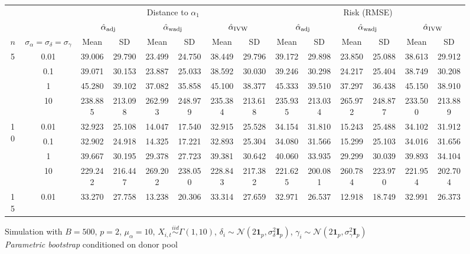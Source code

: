 \documentclass[11pt]{article}
\newcommand{\simiid}{\stackrel{iid}{\sim}} %
\def\normal#1#2{\mathcal{N}(#1,#2)} %
\theoremstyle{definition}
\begin{document}
\begin{sidewaysfigure}
\centering
\caption{Simulation  with $B = 500$, $p = 2$, $\mu_{\alpha}=10$, $X_{i,t} \simiid \Gamma(1,10)$, $\delta_i \sim \normal{2\mathbf{1}_p}{\sigma^2_{\delta}\mathbf{I}_p}$, $\gamma_i \sim \normal{2\mathbf{1}_p}{\sigma^2_{\gamma}\mathbf{I}_p}$ \\ \emph{Parametric bootstrap} conditioned on donor pool}
\begin{tabular}{cc|cccccc|cccccc}
  && \multicolumn{6}{c|}{Distance to $\alpha_1$}  & \multicolumn{6}{c}{Risk (RMSE)}  \\ 
   & & \multicolumn{2}{c}{$\hat{\alpha}_{\rm adj}$}  & \multicolumn{2}{c}{$\hat{\alpha}_{\rm wadj}$} & \multicolumn{2}{c|}{$\hat{\alpha}_{\rm IVW}$} & \multicolumn{2}{c}{$\hat{\alpha}_{\rm adj}$} & \multicolumn{2}{c}{$\hat{\alpha}_{\rm wadj}$}  & \multicolumn{2}{c}{$\hat{\alpha}_{\rm IVW}$}   \\ 
  $n$   & $\sigma_{\alpha} = \sigma_{\delta}=\sigma_{\gamma}$  & Mean & SD & Mean & SD & Mean & SD & Mean & SD & Mean & SD & Mean & SD  \\[.3cm]  
    \hline
 \multirow{4}{*}{5}  & 0.01 & 39.006 & 29.790 & 23.499 & 24.750 & 38.449 & 29.796 & 39.172 & 29.898 & 23.850 & 25.088 & 38.613 & 29.912 \\ 
    & 0.1 & 39.071 & 30.153 & 23.887 & 25.033 & 38.592 & 30.030 & 39.246 & 30.298 & 24.217 & 25.404 & 38.749 & 30.208 \\ 
   & 1   & 45.280 & 39.102 & 37.082 & 35.858 & 45.100 & 38.377 & 45.333 & 39.510 & 37.297 & 36.438 & 45.150 & 38.910 \\ 
   & 10   & 238.885 & 213.098 & 262.993 & 248.979 & 235.384 & 213.618 & 235.935 & 213.034 & 265.972 & 248.877 & 233.500 & 213.889 \\[.3cm]  
\multirow{4}{*}{10}   & 0.01 & 32.923 & 25.108 & 14.047 & 17.540 & 32.915 & 25.528 & 34.154 & 31.810 & 15.243 & 25.488 & 34.102 & 31.912 \\ 
  & 0.1 & 32.902 & 24.918 & 14.325 & 17.221 & 32.893 & 25.304 & 34.080 & 31.566 & 15.299 & 25.103 & 34.016 & 31.656 \\ 
   & 1   & 39.667 & 30.195 & 29.378 & 27.723 & 39.381 & 30.642 & 40.060 & 33.935 & 29.299 & 30.039 & 39.893 & 34.104 \\ 
 & 10   & 229.242 & 216.447 & 269.202 & 238.050 & 228.843 & 217.382 & 221.625 & 200.081 & 260.784 & 223.970 & 221.954 & 202.704\\[.3cm]  
\multirow{4}{*}{15}   & 0.01 & 33.270 & 27.758 & 13.238 & 20.306 & 33.314 & 27.659 & 32.971 & 26.537 & 12.918 & 18.749 & 32.991 & 26.373 \\ 

\end{tabular}
\end{sidewaysfigure}
\end{document}
